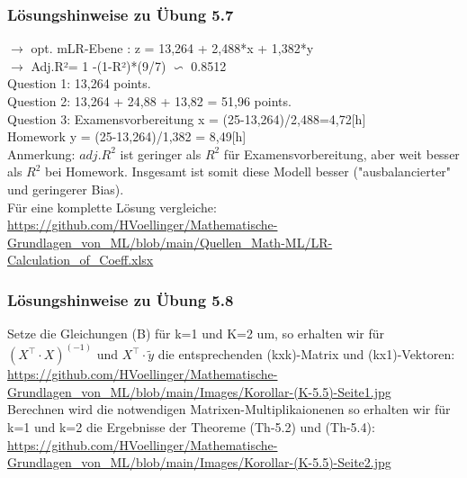 \documentclass[12pt]{article}
\begin{document}
\subsubsection{Lösungshinweise zu Übung 5.7}
%
$\rightarrow$ opt. mLR-Ebene :  z = 13,264 +  2,488*x +  1,382*y \\[0.2cm]				
$\rightarrow$ Adj.R²=  1 -(1-R²)*(9/7) $\backsim $ 0.8512  \\[0.3cm]				
Question 1:  13,264 points.	\\[0.1cm]
Question 2:  13,264 + 24,88 + 13,82 = 51,96 points.\\[0.1cm]
Question 3:  Examensvorbereitung x = (25-13,264)/2,488=4,72[h]\\ Homework y = (25-13,264)/1,382 = 8,49[h]\\[0.2cm]
Anmerkung: $adj.R^2$ ist geringer als $R^2$ für Examensvorbereitung, aber weit besser als $R^2$ bei Homework. Insgesamt ist somit diese Modell besser ("ausbalancierter" und geringerer Bias). \\[0.2cm]
%	
\hspace*{0.0cm}Für eine komplette Lösung vergleiche:\\
\url{https://github.com/HVoellinger/Mathematische-Grundlagen_von_ML/blob/main/Quellen_Math-ML/LR-Calculation_of_Coeff.xlsx}

\subsubsection{Lösungshinweise zu Übung 5.8}
%
Setze die Gleichungen (B) für k=1 und K=2 um, so erhalten wir für $(X^\top \cdot X)^{(-1)}$ und $X^\top \cdot \widetilde{y} $ die entsprechenden (kxk)-Matrix und (kx1)-Vektoren:\\
\url{https://github.com/HVoellinger/Mathematische-Grundlagen_von_ML/blob/main/Images/Korollar-(K-5.5)-Seite1.jpg}  \\
Berechnen wird die notwendigen Matrixen-Multiplikaionenen so erhalten wir für k=1 und k=2 die Ergebnisse der Theoreme (Th-5.2) und (Th-5.4):\\
\url{https://github.com/HVoellinger/Mathematische-Grundlagen_von_ML/blob/main/Images/Korollar-(K-5.5)-Seite2.jpg}
%

%
\end{document}

